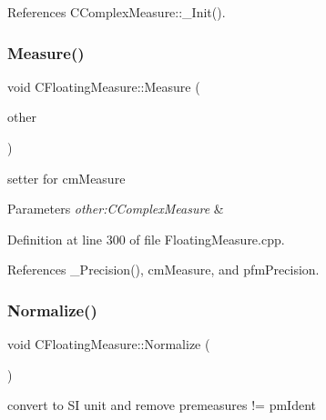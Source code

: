 References C\+Complex\+Measure\+::\+\_\+\+Init().

\mbox{\label{classCFloatingMeasure_af35c54ac06b1c8ddca86390360559548}} 
\subsubsection{\texorpdfstring{Measure()}{Measure()}\hspace{0.1cm}{\footnotesize\ttfamily [2/2]}}
{\footnotesize\ttfamily void C\+Floating\+Measure\+::\+Measure (\begin{DoxyParamCaption}\item[{const \hyperlink{classCComplexMeasure}{C\+Complex\+Measure} \&}]{other }\end{DoxyParamCaption})\hspace{0.3cm}{\ttfamily [protected]}}



setter for cm\+Measure 


\begin{DoxyParams}{Parameters}
{\em other\+:\+C\+Complex\+Measure} & \\
\hline
\end{DoxyParams}


Definition at line 300 of file Floating\+Measure.\+cpp.



References \+\_\+\+Precision(), cm\+Measure, and pfm\+Precision.

\mbox{\label{classCFloatingMeasure_af4e2cc6a78b8e0cda11df432902bde8a}} 
\subsubsection{\texorpdfstring{Normalize()}{Normalize()}}
{\footnotesize\ttfamily void C\+Floating\+Measure\+::\+Normalize (\begin{DoxyParamCaption}{ }\end{DoxyParamCaption})}



convert to SI unit and remove premeasures != pm\+Ident 



